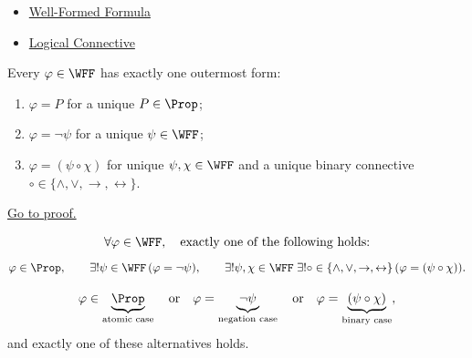 \begin{dependencies}
\begin{itemize}
  \item \hyperref[def:well-formed-formula]{Well-Formed Formula}
  \item \hyperref[def:logical-connective]{Logical Connective}
\end{itemize}
\end{dependencies}
\begin{tcolorbox}[colback=thmbox, colframe=thmborder, arc=2pt,
  left=6pt, right=6pt, top=4pt, bottom=4pt,
  title={\small\textbf{Theorem (Unique Decomposition for Propositional Formulas)}},
  fonttitle=\small\bfseries]
\begin{theorem}
\label{thm:unique-decomposition-propositional-formulas}
Every \(\varphi\in\WFF\) has exactly one outermost form:
\begin{enumerate}
\item \(\varphi=P\) for a unique \(P\in\Prop\);
\item \(\varphi=\neg\psi\) for a unique \(\psi\in\WFF\);
\item \(\varphi=(\psi\circ\chi)\) for unique \(\psi,\chi\in\WFF\) and a unique binary connective \(\circ\in\{\land,\lor,\to,\leftrightarrow\}\).
\end{enumerate}

\noindent\hyperref[prf:unique-decomposition-propositional-formulas]{Go to proof.}
\end{theorem}
\end{tcolorbox}

\begin{remark*}
\[
\forall\varphi\in\WFF,\quad
\text{exactly one of the following holds:}
\]
\[
\varphi\in\Prop,\qquad
\exists!\psi\in\WFF\,(\varphi=\neg\psi),\qquad
\exists!\psi,\chi\in\WFF\;\exists!\circ\in\{\land,\lor,\to,\leftrightarrow\}\,(\varphi=(\psi\circ\chi)).
\]
\end{remark*}

\begin{remark*}
\[
\varphi
\in
\underbrace{\Prop}_{\text{atomic case}}
\quad\text{or}\quad
\varphi=
\underbrace{\neg\psi}_{\text{negation case}}
\quad\text{or}\quad
\varphi=
\underbrace{(\psi\circ\chi)}_{\text{binary case}},
\]
and exactly one of these alternatives holds.
\end{remark*}

